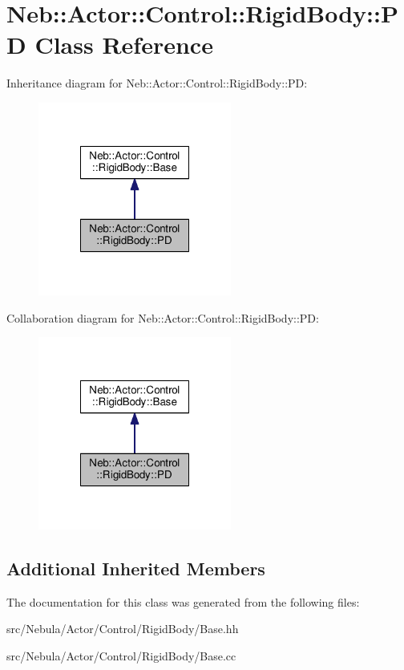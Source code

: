 \hypertarget{classNeb_1_1Actor_1_1Control_1_1RigidBody_1_1PD}{\section{Neb\-:\-:Actor\-:\-:Control\-:\-:Rigid\-Body\-:\-:P\-D Class Reference}
\label{classNeb_1_1Actor_1_1Control_1_1RigidBody_1_1PD}
}


Inheritance diagram for Neb\-:\-:Actor\-:\-:Control\-:\-:Rigid\-Body\-:\-:P\-D\-:
\nopagebreak
\begin{figure}[H]
\begin{center}
\leavevmode
\includegraphics[width=180pt]{classNeb_1_1Actor_1_1Control_1_1RigidBody_1_1PD__inherit__graph}
\end{center}
\end{figure}


Collaboration diagram for Neb\-:\-:Actor\-:\-:Control\-:\-:Rigid\-Body\-:\-:P\-D\-:
\nopagebreak
\begin{figure}[H]
\begin{center}
\leavevmode
\includegraphics[width=180pt]{classNeb_1_1Actor_1_1Control_1_1RigidBody_1_1PD__coll__graph}
\end{center}
\end{figure}
\subsection*{Additional Inherited Members}


The documentation for this class was generated from the following files\-:\begin{DoxyCompactItemize}
\item 
src/\-Nebula/\-Actor/\-Control/\-Rigid\-Body/Base.\-hh\item 
src/\-Nebula/\-Actor/\-Control/\-Rigid\-Body/Base.\-cc\end{DoxyCompactItemize}
